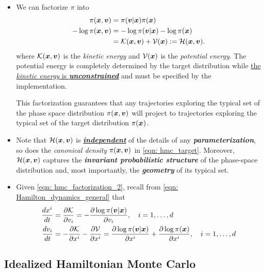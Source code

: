 \documentclass[11pt]{article}
\begin{document}
\begin{itemize}
\item We can factorize $\pi$ into
\begin{align}
\pi(\boldsymbol{x}, \boldsymbol{v}) &= \pi(\boldsymbol{v}|\boldsymbol{x})\pi(\boldsymbol{x}) \label{eqn: hmc_factorization} \\
-\log \pi(\boldsymbol{x}, \boldsymbol{v}) &= -\log \pi(\boldsymbol{v}|\boldsymbol{x}) - \log \pi(\boldsymbol{x}) \nonumber\\
&={\mathcal K}(\boldsymbol{x}, \boldsymbol{v}) + {\mathcal V}(\boldsymbol{x}) := {\mathcal H}(\boldsymbol{x}, \boldsymbol{v}).\label{eqn: hmc_factorization_2}
\end{align} where ${\mathcal K}(\boldsymbol{x}, \boldsymbol{v})$ is the \emph{kinetic energy} and $ {\mathcal V}(\boldsymbol{x})$ is the \emph{potential energy}. The potential energy is completely determined by the target distribution while \underline{the \emph{kinetic energy} is \emph{\textbf{unconstrained}}} and must be specified by the implementation.

This factorization guarantees that any trajectories exploring the typical set of the phase space distribution  $\pi(\boldsymbol{x}, \boldsymbol{v})$ will project to trajectories exploring the typical set of the target distribution $\pi(\boldsymbol{x})$.

\item Note that ${\mathcal H}(\boldsymbol{x}, \boldsymbol{v})$ is \underline{\emph{\textbf{independent}}} of the details of any \emph{\textbf{parameterization}}, so does the \emph{canonical density} $\pi(\boldsymbol{x}, \boldsymbol{v})$ in \eqref{eqn: hmc_target}. Moreover, ${\mathcal H}(\boldsymbol{x}, \boldsymbol{v})$ captures the \emph{\textbf{invariant probabilistic structure}} of the phase-space distribution and, most importantly, the \emph{\textbf{geometry}} of its typical set.

\item  Given \eqref{eqn: hmc_factorization_2}, recall from \eqref{eqn: Hamilton_dynamics_general} that
\begin{align}
\frac{d x^{i}}{dt} &=  \frac{\partial {\mathcal K}}{ \partial v_{i}} = -\frac{\partial \log \pi(\boldsymbol{v}|\boldsymbol{x})}{ \partial v_{i}}, \quad  i=1,\ldots, d \nonumber\\
\frac{d v_{i}}{dt} &= - \frac{\partial {\mathcal K}}{ \partial x^{i}} - \frac{\partial {\mathcal V}}{ \partial x^{i}} = \frac{\partial \log \pi(\boldsymbol{v}|\boldsymbol{x})}{ \partial x^{i}}+\frac{\partial \log \pi(\boldsymbol{x})}{ \partial x^{i}}, \quad  i=1,\ldots, d \label{eqn: hmc_hamiltonian_eqn}
\end{align}
\end{itemize}


\subsection{Idealized Hamiltonian Monte Carlo}
\end{document}
